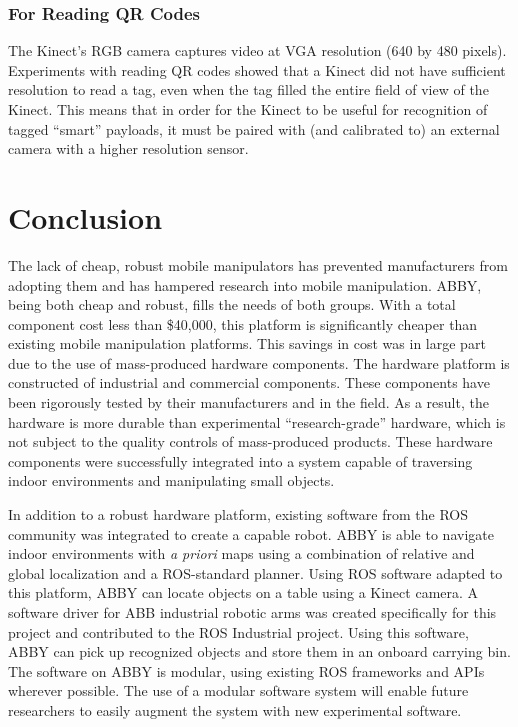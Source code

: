 \documentclass[]{cwru} %
\begin{document}
\subsection{For Reading QR Codes}

The Kinect's RGB camera captures video at VGA resolution (640 by 480
pixels). Experiments with reading QR codes showed that a Kinect did not
have sufficient resolution to read a tag, even when the tag filled the
entire field of view of the Kinect. This means that in order for the
Kinect to be useful for recognition of tagged ``smart'' payloads, it
must be paired with (and calibrated to) an external camera with a higher
resolution sensor.

\chapter{Conclusion}

The lack of cheap, robust mobile manipulators has prevented
manufacturers from adopting them and has hampered research into mobile
manipulation. ABBY, being both cheap and robust, fills the needs of both
groups. With a total component cost less than \$40,000, this platform is
significantly cheaper than existing mobile manipulation platforms. This
savings in cost was in large part due to the use of mass-produced
hardware components. The hardware platform is constructed of industrial
and commercial components. These components have been rigorously tested
by their manufacturers and in the field. As a result, the hardware is
more durable than experimental ``research-grade'' hardware, which is not
subject to the quality controls of mass-produced products. These
hardware components were successfully integrated into a system capable
of traversing indoor environments and manipulating small objects.

In addition to a robust hardware platform, existing software from the
ROS community was integrated to create a capable robot. ABBY is able to
navigate indoor environments with \emph{a priori} maps using a
combination of relative and global localization and a ROS-standard
planner. Using ROS software adapted to this platform, ABBY can locate
objects on a table using a Kinect camera. A software driver for ABB
industrial robotic arms was created specifically for this project and
contributed to the ROS Industrial project. Using this software, ABBY can
pick up recognized objects and store them in an onboard carrying bin.
The software on ABBY is modular, using existing ROS frameworks and APIs
wherever possible. The use of a modular software system will enable
future researchers to easily augment the system with new experimental
software.
\end{document}
